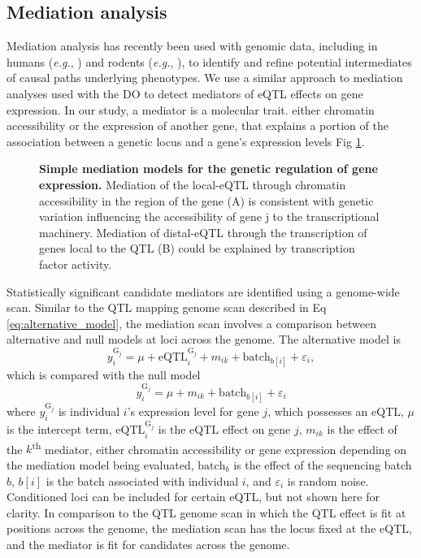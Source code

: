 \documentclass[10pt,letterpaper]{article}
\newcommand{\eg}{\emph{e.g.}\xspace}
\begin{document}
\subsection*{Mediation analysis}

Mediation analysis has recently been used with genomic data, including in humans (\eg, \cite{Battle2014}) and rodents (\eg, \cite{Keele2018,Oreper2018}), to identify and refine potential intermediates of causal paths underlying phenotypes. We use a similar approach to mediation analyses used with the DO \cite{Chick2016, Keller2018} to detect mediators of eQTL effects on gene expression. In our study, a mediator is a molecular trait. either chromatin accessibility or the expression of another gene, that explains a portion of the association between a genetic locus and a gene's expression levels Fig \ref{fig:graph}.

\begin{figure}[!h]
\caption{{\bf Simple mediation models for the genetic regulation of gene expression.} 
Mediation of the local-eQTL through chromatin accessibility in the region of the gene (A) is consistent with genetic variation influencing the accessibility of gene j to the transcriptional machinery. Mediation of distal-eQTL through the transcription of genes local to the QTL (B) could be explained by transcription factor activity.
\label{fig:graph}}
\end{figure}

Statistically significant candidate mediators are identified using a genome-wide scan. 
Similar to the QTL mapping genome scan described in Eq \ref{eq:alternative_model}, the mediation scan involves a comparison between alternative and null models at loci across the genome. The alternative model is
\begin{equation}
y^{\text{G}_{j}}_{i} = \mu + \text{eQTL}_{i}^{\text{G}_{j}} + m_{ik} + \text{batch}_{b[i]} + \varepsilon_{i},
\label{eq:mediation_alt}
\end{equation}
which is compared with the null model
\begin{equation}
y^{\text{G}_{j}}_{i} = \mu + m_{ik} \nonumber + \text{batch}_{b[i]} + \varepsilon_{i}
\label{eq:mediation_null}
\end{equation}
where $y^{\text{G}_{j}}_{i}$ is individual $i$'s expression level for gene $j$, which possesses an eQTL, $\mu$ is the intercept term, $\text{eQTL}_{i}^{\text{G}_{j}}$ is the eQTL effect on gene $j$, $m_{ik}$ is the effect of the $k$\textsuperscript{th} mediator, either chromatin accessibility or gene expression depending on the mediation model being evaluated, $\text{batch}_{b}$ is the effect of the sequencing batch $b$, $b[i]$ is the batch associated with individual $i$, and $\varepsilon_{i}$ is random noise. Conditioned loci can be included for certain eQTL, but not shown here for clarity. In comparison to the QTL genome scan in which the QTL effect is fit at positions across the genome, the mediation scan has the locus fixed at the eQTL, and the mediator is fit for candidates across the genome.
\end{document}
